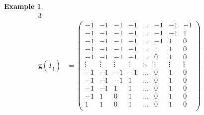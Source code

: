 \documentclass{amsart}
\theoremstyle{definition}
\newtheorem{example}[theorem]{Example}
\renewcommand{\b}[1]{{\boldsymbol{#1}}} %
\begin{document}
\begin{example}
\begin{table}
\begin{alignat*}{3}
	\\[.3cm]
	\b{g}(T_\uparrow) & = \begin{pmatrix}
		-1 & -1 & -1 & -1 & \dots & -1 & -1 & -1 \\
		-1 & -1 & -1 & -1 & \dots & -1 & -1 & 1 \\
		-1 & -1 & -1 & -1 & \dots & -1 & 1 & 0 \\
		-1 & -1 & -1 & -1 & \dots & 1 & 1 & 0 \\
		-1 & -1 & -1 & -1 & \dots & 0 & 1 & 0 \\
		\vdots & \vdots & \vdots & \vdots & \ddots & \vdots & \vdots & \vdots \\
		-1 & -1 & -1 & -1 & \dots & 0 & 1 & 0 \\
		-1 & -1 & -1 & 1 & \dots & 0 & 1 & 0 \\
		-1 & -1 & 1 & 1 & \dots & 0 & 1 & 0 \\
		-1 & 1 & 0 & 1 & \dots & 0 & 1 & 0 \\
		1 & 1 & 0 & 1 & \dots & 0 & 1 & 0 \\
	\end{pmatrix}
	\qquad &

\end{alignat*}
\end{table}
\end{example}
\end{document}
